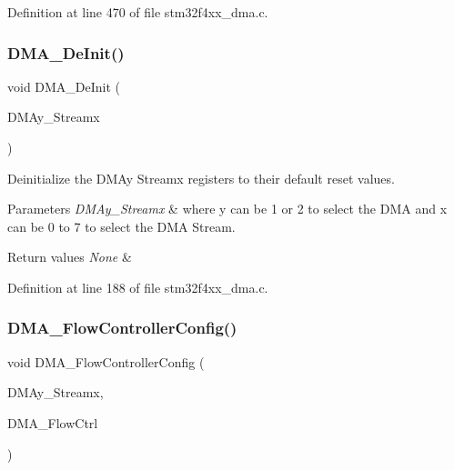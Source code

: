 Definition at line 470 of file stm32f4xx\+\_\+dma.\+c.

\mbox{\label{group___d_m_a___group1_ga38d4a4ab8990299f8a6cf064e1e811d0}} 
\subsubsection{\texorpdfstring{D\+M\+A\+\_\+\+De\+Init()}{DMA\_DeInit()}}
{\footnotesize\ttfamily void D\+M\+A\+\_\+\+De\+Init (\begin{DoxyParamCaption}\item[{\hyperlink{struct_d_m_a___stream___type_def}{D\+M\+A\+\_\+\+Stream\+\_\+\+Type\+Def} $\ast$}]{D\+M\+Ay\+\_\+\+Streamx }\end{DoxyParamCaption})}



Deinitialize the D\+M\+Ay Streamx registers to their default reset values. 


\begin{DoxyParams}{Parameters}
{\em D\+M\+Ay\+\_\+\+Streamx} & where y can be 1 or 2 to select the D\+MA and x can be 0 to 7 to select the D\+MA Stream. \\
\hline
\end{DoxyParams}

\begin{DoxyRetVals}{Return values}
{\em None} & \\
\hline
\end{DoxyRetVals}


Definition at line 188 of file stm32f4xx\+\_\+dma.\+c.

\mbox{\label{group___d_m_a___group1_ga77f7628f6be9d6d088127eceb090b8b2}} 
\subsubsection{\texorpdfstring{D\+M\+A\+\_\+\+Flow\+Controller\+Config()}{DMA\_FlowControllerConfig()}}
{\footnotesize\ttfamily void D\+M\+A\+\_\+\+Flow\+Controller\+Config (\begin{DoxyParamCaption}\item[{\hyperlink{struct_d_m_a___stream___type_def}{D\+M\+A\+\_\+\+Stream\+\_\+\+Type\+Def} $\ast$}]{D\+M\+Ay\+\_\+\+Streamx,  }\item[{uint32\+\_\+t}]{D\+M\+A\+\_\+\+Flow\+Ctrl }\end{DoxyParamCaption})}



